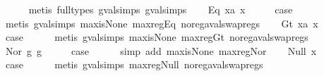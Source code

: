 \begin{isabellebody}
\ \ \ \ \isamarkupfalse%
\ {\isacharparenleft}metis\ {\isacharparenleft}full{\isacharunderscore}types{\isacharparenright}\ gval{\isachardot}simps{\isacharparenleft}{}{\isacharparenright}\ gval{\isachardot}simps{\isacharparenleft}{}{\isacharparenright}{\isacharparenright}\isanewline
{}\isamarkupfalse%
\isanewline
\ \ \isamarkupfalse%
\ {\isacharparenleft}Eq\ x{}a\ x{}{\isacharparenright}\isanewline
\ \ \isamarkupfalse%
\ \isamarkupfalse%
\ {\isacharquery}case\isanewline
\ \ \ \ \isamarkupfalse%
\ {\isacharparenleft}metis\ gval{\isachardot}simps{\isacharparenleft}{}{\isacharparenright}\ max{\isacharunderscore}is{\isacharunderscore}None\ max{\isacharunderscore}reg{\isacharunderscore}Eq\ no{\isacharunderscore}reg{\isacharunderscore}aval{\isacharunderscore}swap{\isacharunderscore}regs{\isacharparenright}\isanewline
{}\isamarkupfalse%
\isanewline
\ \ \isamarkupfalse%
\ {\isacharparenleft}Gt\ x{}a\ x{}{\isacharparenright}\isanewline
\ \ \isamarkupfalse%
\ \isamarkupfalse%
\ {\isacharquery}case\isanewline
\ \ \ \ \isamarkupfalse%
\ {\isacharparenleft}metis\ gval{\isachardot}simps{\isacharparenleft}{}{\isacharparenright}\ max{\isacharunderscore}is{\isacharunderscore}None\ max{\isacharunderscore}reg{\isacharunderscore}Gt\ no{\isacharunderscore}reg{\isacharunderscore}aval{\isacharunderscore}swap{\isacharunderscore}regs{\isacharparenright}\isanewline
{}\isamarkupfalse%
\isanewline
\ \ \isamarkupfalse%
\ {\isacharparenleft}Nor\ g{}\ g{}{\isacharparenright}\isanewline
\ \ \isamarkupfalse%
\ \isamarkupfalse%
\ {\isacharquery}case\isanewline
\ \ \ \ \isamarkupfalse%
\ {\isacharparenleft}simp\ add{\isacharcolon}\ max{\isacharunderscore}is{\isacharunderscore}None\ max{\isacharunderscore}reg{\isacharunderscore}Nor{\isacharparenright}\isanewline
{}\isamarkupfalse%
\isanewline
\ \ \isamarkupfalse%
\ {\isacharparenleft}Null\ x{\isacharparenright}\isanewline
\ \ \isamarkupfalse%
\ \isamarkupfalse%
\ {\isacharquery}case\isanewline
\ \ \ \ \isamarkupfalse%
\ {\isacharparenleft}metis\ gval{\isachardot}simps{\isacharparenleft}{}{\isacharparenright}\ max{\isacharunderscore}reg{\isacharunderscore}Null\ no{\isacharunderscore}reg{\isacharunderscore}aval{\isacharunderscore}swap{\isacharunderscore}regs{\isacharparenright}\isanewline

\end{isabellebody}
